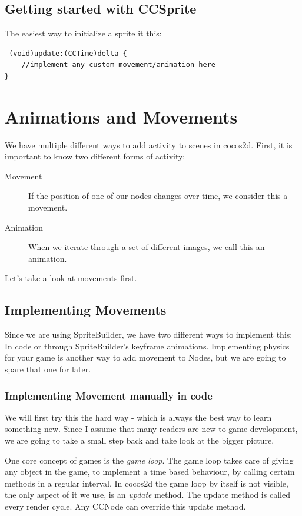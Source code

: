 \documentclass{scrreprt}
\newcommand{\cocos}{cocos2d}
\newcommand{\spriteb}{SpriteBuilder}
\begin{document}
\section{Getting started with CCSprite}
The easiest way to initialize a sprite it this:
\begin{lstlisting}
-(void)update:(CCTime)delta {
	//implement any custom movement/animation here
}
\end{lstlisting}

\chapter{Animations and Movements}
We have multiple different ways to add activity to scenes in \cocos{}. First, it
is important to know two different forms of activity:
 
\begin{description}
  \item[Movement] If the position of one of our nodes changes over time, we
  consider this a movement.
  \item[Animation] When we iterate through a set of different images, we call
  this an animation.
\end{description}

Let's take a look at movements first.

\section{Implementing Movements}
Since we are using \spriteb{}, we have two different ways to implement this:
In code or through \spriteb{}'s keyframe animations. Implementing physics for
your game is another way to add movement to Nodes, but we are going to spare
that one for later.

\subsection{Implementing Movement manually in code}
We will first try this the hard way - which is always the best way to learn
something new. Since I assume that many readers are new to game development, we
are going to take a small step back and take look at the bigger picture.

One core concept of games is the \textit{game loop}. The game loop takes care of
giving any object in the game, to implement a time based behaviour, by calling
certain methods in a regular interval. In \cocos{} the game loop by itself is
not visible, the only aspect of it we use, is an \textit{update} method. The
update method is called every render cycle. Any CCNode can override this update
method.
\end{document}
